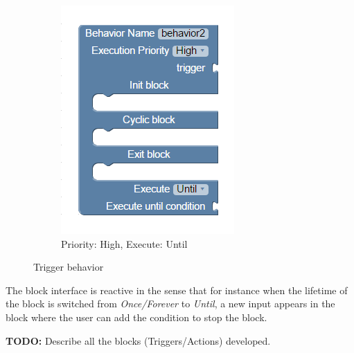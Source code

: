 \begin{figure}[H]
\begin{subfigure}[t]{0.38\textwidth}
\includegraphics[width=\textwidth]{../thesis/assets/blocks_behavior2.png}
\caption[Example 2]{Priority: High, Execute: Until}
\label{fig:trigger_block2}
\end{subfigure}
\caption[Trigger behavior]{Trigger behavior}
\label{fig:blocks_trigger}
\end{figure}
The block interface is reactive in the sense that for instance when the lifetime of the block is switched from \emph{Once/Forever} to \emph{Until}, a new input appears in the block where the user can add the condition to stop the block.

\textbf{TODO: } Describe all the blocks (Triggers/Actions) developed.

